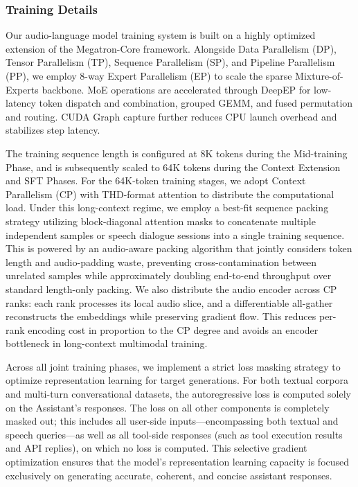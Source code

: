 \subsubsection{Training Details}
Our audio-language model training system is built on a highly optimized extension of the Megatron-Core framework.   Alongside Data Parallelism (DP), Tensor Parallelism (TP), Sequence Parallelism (SP), and Pipeline Parallelism (PP), we employ 8-way Expert Parallelism (EP) to scale the sparse Mixture-of-Experts backbone.   MoE operations are accelerated through DeepEP for low-latency token dispatch and combination, grouped GEMM, and fused permutation and routing.   CUDA Graph capture further reduces CPU launch overhead and stabilizes step latency.

The training sequence length is configured at 8K tokens during the Mid-training Phase, and is subsequently scaled to 64K tokens during the Context Extension and SFT Phases.   For the 64K-token training stages, we adopt Context Parallelism (CP) with THD-format attention to distribute the computational load.   Under this long-context regime, we employ a best-fit sequence packing strategy utilizing block-diagonal attention masks to concatenate multiple independent samples or speech dialogue sessions into a single training sequence.   This is powered by an audio-aware packing algorithm that jointly considers token length and audio-padding waste, preventing cross-contamination between unrelated samples while approximately doubling end-to-end throughput over standard length-only packing.   We also distribute the audio encoder across CP ranks: each rank processes its local audio slice, and a differentiable all-gather reconstructs the embeddings while preserving gradient flow.   This reduces per-rank encoding cost in proportion to the CP degree and avoids an encoder bottleneck in long-context multimodal training.

Across all joint training phases, we implement a strict loss masking strategy to optimize representation learning for target generations.   For both textual corpora and multi-turn conversational datasets, the autoregressive loss is computed solely on the Assistant's responses.   The loss on all other components is completely masked out;   this includes all user-side inputs—encompassing both textual and speech queries—as well as all tool-side responses (such as tool execution results and API replies), on which no loss is computed.   This selective gradient optimization ensures that the model's representation learning capacity is focused exclusively on generating accurate, coherent, and concise assistant responses.

